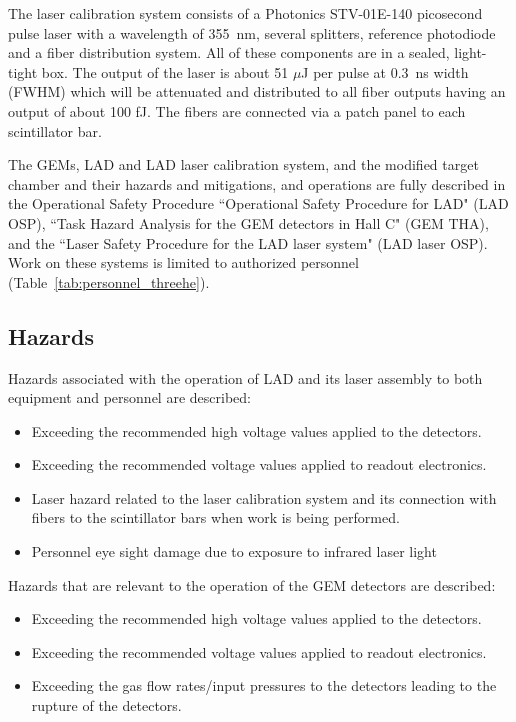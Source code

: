 The laser calibration system consists of a Photonics STV-01E-140 picosecond pulse laser with a wavelength of 355~nm, several splitters, reference photodiode and a fiber distribution system. All of these components are in
a sealed, light-tight box. The output of the laser is about 51 $\mu$J per pulse at
0.3~ns width (FWHM) which will be attenuated and distributed to all fiber
outputs having an output of about 100 fJ. The fibers are connected via a patch panel to each scintillator bar.

The GEMs, LAD and LAD laser calibration system, and the modified target chamber and their hazards and mitigations, and operations are fully described in the Operational Safety Procedure ``Operational Safety Procedure for LAD" (LAD OSP), ``Task Hazard Analysis for the GEM detectors in Hall C" (GEM THA), and the ``Laser Safety Procedure for the LAD laser system" (LAD laser OSP). Work on these
systems is limited to authorized personnel (Table~\ref{tab:personnel_threehe}).


\subsection{Hazards}
Hazards associated with the operation of LAD and its laser assembly to both equipment and personnel are described:
\begin{itemize}
\item Exceeding the recommended high voltage values applied to the detectors.
\item Exceeding the recommended voltage values applied to readout electronics. 
\item Laser hazard related to the laser calibration system and its connection with fibers to the scintillator bars when work is being performed. 
\item Personnel eye sight damage due to exposure to infrared laser light
\end{itemize}

Hazards that are relevant to the operation of the GEM detectors are described:
\begin{itemize}
\item Exceeding the recommended high voltage values applied to the detectors.
\item Exceeding the recommended voltage values applied to readout electronics. 
\item Exceeding the gas flow rates/input pressures to the detectors leading to the rupture of the detectors.
\end{itemize}

